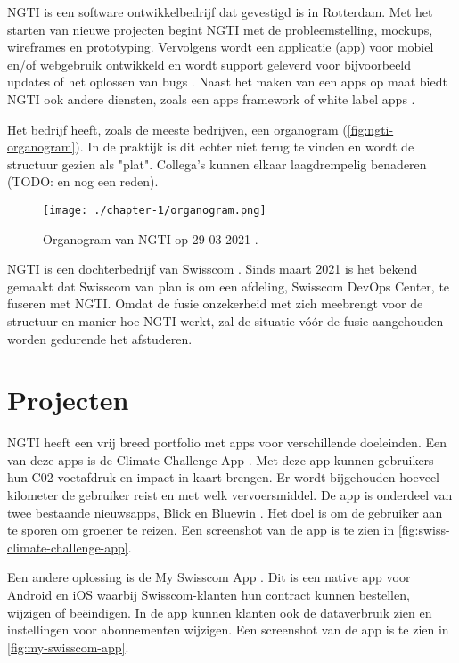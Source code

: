 
NGTI is een software ontwikkelbedrijf dat gevestigd is in Rotterdam. Met het starten van nieuwe projecten begint NGTI met de probleemstelling, mockups, wireframes en prototyping. Vervolgens wordt een applicatie (app) voor mobiel en/of webgebruik ontwikkeld en wordt support geleverd voor bijvoorbeeld updates of het oplossen van bugs \cite{ngti-services}. Naast het maken van een apps op maat biedt NGTI ook andere diensten, zoals een apps framework of white label apps \cite{ngti-solutions}.

Het bedrijf heeft, zoals de meeste bedrijven, een organogram (\autoref{fig:ngti-organogram}). In de praktijk is dit echter niet terug te vinden en wordt de structuur gezien als "plat". Collega's kunnen elkaar laagdrempelig benaderen (TODO: en nog een reden).

\begin{figure}[hbt!]
  \centering
  \texttt{[image: ./chapter-1/organogram.png]}
  \caption{Organogram van NGTI op 29-03-2021 \cite{ngti-organogram}.}
  \label{fig:ngti-organogram}
\end{figure}

NGTI is een dochterbedrijf van Swisscom \cite{swisscom-other-division}. Sinds maart 2021 is het bekend gemaakt dat Swisscom van plan is om een afdeling, Swisscom DevOps Center, te fuseren met NGTI. Omdat de fusie onzekerheid met zich meebrengt voor de structuur en manier hoe NGTI werkt, zal de situatie vóór de fusie aangehouden worden gedurende het afstuderen.

\section{Projecten}\label{sec:projecten}
NGTI heeft een vrij breed portfolio met apps voor verschillende doeleinden. Een van deze apps is de Climate Challenge App \cite{ngti-swisscom-climate-challenge}. Met deze app kunnen gebruikers hun C02-voetafdruk en impact in kaart brengen. Er wordt bijgehouden hoeveel kilometer de gebruiker reist en met welk vervoersmiddel. De app is onderdeel van twee bestaande nieuwsapps, Blick en Bluewin \cite{swisscom-climate-challenge-integration}. Het doel is om de gebruiker aan te sporen om groener te reizen. Een screenshot van de app is te zien in \autoref{fig:swiss-climate-challenge-app}.

Een andere oplossing is de My Swisscom App \cite{ngti-my-swisscom-app}. Dit is een native app voor Android en iOS waarbij Swisscom-klanten hun contract kunnen bestellen, wijzigen of beëindigen. In de app kunnen klanten ook de dataverbruik zien en instellingen voor abonnementen wijzigen. Een screenshot van de app is te zien in \autoref{fig:my-swisscom-app}.


